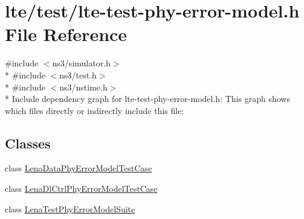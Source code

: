 \hypertarget{lte-test-phy-error-model_8h}{}\section{lte/test/lte-\/test-\/phy-\/error-\/model.h File Reference}
\label{lte-test-phy-error-model_8h}
{\ttfamily \#include $<$ns3/simulator.\+h$>$}\\*
{\ttfamily \#include $<$ns3/test.\+h$>$}\\*
{\ttfamily \#include $<$ns3/nstime.\+h$>$}\\*
Include dependency graph for lte-\/test-\/phy-\/error-\/model.h\+:
This graph shows which files directly or indirectly include this file\+:
\subsection*{Classes}
\begin{DoxyCompactItemize}
\item 
class \hyperlink{classLenaDataPhyErrorModelTestCase}{Lena\+Data\+Phy\+Error\+Model\+Test\+Case}
\item 
class \hyperlink{classLenaDlCtrlPhyErrorModelTestCase}{Lena\+Dl\+Ctrl\+Phy\+Error\+Model\+Test\+Case}
\item 
class \hyperlink{classLenaTestPhyErrorModelSuite}{Lena\+Test\+Phy\+Error\+Model\+Suite}
\end{DoxyCompactItemize}
